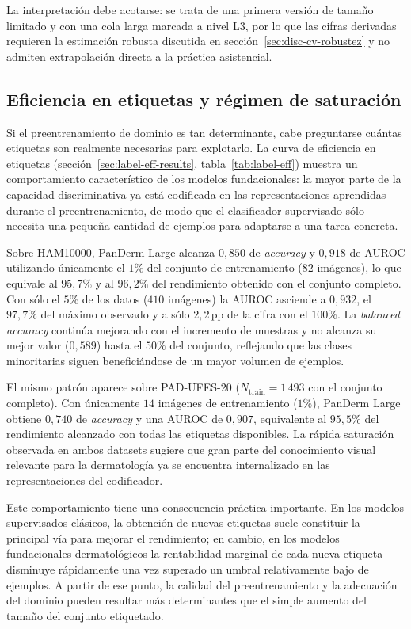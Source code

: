 La interpretación debe acotarse: se trata de una primera versión de
tamaño limitado y con una cola larga marcada a nivel L3, por lo que las
cifras derivadas requieren la estimación robusta discutida en
sección~\ref{sec:disc-cv-robustez} y no admiten extrapolación directa a
la práctica asistencial.

\subsection{Eficiencia en etiquetas y régimen de saturación}
\label{sec:disc-eficiencia}

Si el preentrenamiento de dominio es tan determinante, cabe
preguntarse cuántas etiquetas son realmente necesarias para
explotarlo. La curva de eficiencia en etiquetas
(sección~\ref{sec:label-eff-results}, tabla~\ref{tab:label-eff})
muestra un comportamiento característico de los modelos fundacionales:
la mayor parte de la capacidad discriminativa ya está codificada en las
representaciones aprendidas durante el preentrenamiento, de modo que el
clasificador supervisado sólo necesita una pequeña cantidad de ejemplos
para adaptarse a una tarea concreta.

Sobre HAM10000, PanDerm Large alcanza $0{,}850$ de \emph{accuracy} y
$0{,}918$ de AUROC utilizando únicamente el $1\%$ del conjunto de
entrenamiento ($82$ imágenes), lo que equivale al $95{,}7\%$ y al
$96{,}2\%$ del rendimiento obtenido con el conjunto completo. Con sólo
el $5\%$ de los datos ($410$ imágenes) la AUROC asciende a $0{,}932$,
el $97{,}7\%$ del máximo observado y a sólo $2{,}2$\,pp de la cifra con
el $100\%$. La \emph{balanced accuracy} continúa mejorando con el
incremento de muestras y no alcanza su mejor valor ($0{,}589$) hasta el
$50\%$ del conjunto, reflejando que las clases minoritarias siguen
beneficiándose de un mayor volumen de ejemplos.

El mismo patrón aparece sobre PAD-UFES-20 ($N_{\mathrm{train}} = 1\,493$
con el conjunto completo). Con únicamente $14$ imágenes de entrenamiento
($1\%$), PanDerm Large obtiene $0{,}740$ de \emph{accuracy} y una AUROC
de $0{,}907$, equivalente al $95{,}5\%$ del rendimiento alcanzado con
todas las etiquetas disponibles. La rápida saturación observada en ambos
datasets sugiere que gran parte del conocimiento visual relevante para la
dermatología ya se encuentra internalizado en las representaciones del
codificador.

Este comportamiento tiene una consecuencia práctica importante. En los
modelos supervisados clásicos, la obtención de nuevas etiquetas suele
constituir la principal vía para mejorar el rendimiento; en cambio, en
los modelos fundacionales dermatológicos la rentabilidad marginal de
cada nueva etiqueta disminuye rápidamente una vez superado un umbral
relativamente bajo de ejemplos. A partir de ese punto, la calidad del
preentrenamiento y la adecuación del dominio pueden resultar más
determinantes que el simple aumento del tamaño del conjunto etiquetado.

